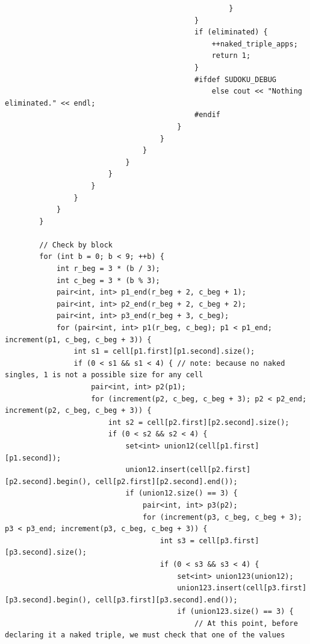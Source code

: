 \documentclass{article}
\begin{document}
\begin{lstlisting}
                                                    }
                                            }
                                            if (eliminated) {
                                                ++naked_triple_apps;
                                                return 1;
                                            }
                                            #ifdef SUDOKU_DEBUG
                                                else cout << "Nothing eliminated." << endl;
                                            #endif
                                        }
                                    }
                                }
                            }
                        }
                    }
                }
            }
        }

        // Check by block
        for (int b = 0; b < 9; ++b) {
            int r_beg = 3 * (b / 3);
            int c_beg = 3 * (b % 3);
            pair<int, int> p1_end(r_beg + 2, c_beg + 1);
            pair<int, int> p2_end(r_beg + 2, c_beg + 2);
            pair<int, int> p3_end(r_beg + 3, c_beg);
            for (pair<int, int> p1(r_beg, c_beg); p1 < p1_end; increment(p1, c_beg, c_beg + 3)) {
                int s1 = cell[p1.first][p1.second].size();
                if (0 < s1 && s1 < 4) { // note: because no naked singles, 1 is not a possible size for any cell
                    pair<int, int> p2(p1);
                    for (increment(p2, c_beg, c_beg + 3); p2 < p2_end; increment(p2, c_beg, c_beg + 3)) {
                        int s2 = cell[p2.first][p2.second].size();
                        if (0 < s2 && s2 < 4) {
                            set<int> union12(cell[p1.first][p1.second]);
                            union12.insert(cell[p2.first][p2.second].begin(), cell[p2.first][p2.second].end());
                            if (union12.size() == 3) {
                                pair<int, int> p3(p2);
                                for (increment(p3, c_beg, c_beg + 3); p3 < p3_end; increment(p3, c_beg, c_beg + 3)) {
                                    int s3 = cell[p3.first][p3.second].size();
                                    if (0 < s3 && s3 < 4) {
                                        set<int> union123(union12);
                                        union123.insert(cell[p3.first][p3.second].begin(), cell[p3.first][p3.second].end());
                                        if (union123.size() == 3) {
                                            // At this point, before declaring it a naked triple, we must check that one of the values

\end{lstlisting}
\end{document}
